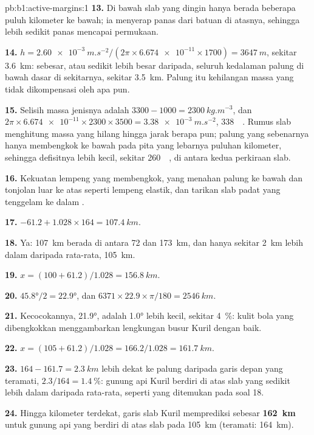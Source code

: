 \begin{solution}{pb:b1:active-margins:1}
\textbf{13.} Di bawah  slab yang dingin hanya berada beberapa puluh kilometer ke
bawah; ia menyerap panas dari batuan di atasnya, sehingga lebih sedikit panas mencapai
permukaan.

\textbf{14.} $h = \qty{2.60e-3}{m.s^{-2}}/(2\pi\times\num{6.674e-11}\times1700)
= \qty{3647}{m}$, sekitar \qty{3.6}{km}: sebesar, atau sedikit lebih besar daripada,
seluruh kedalaman palung di bawah dasar di sekitarnya, sekitar \qty{3.5}{km}. Palung itu
kehilangan massa yang tidak dikompensasi oleh apa pun.

\textbf{15.} Selisih massa jenisnya adalah $3300 - 1000 = \qty{2300}{kg.m^{-3}}$,
dan $2\pi\times\num{6.674e-11}\times2300\times3500 = \qty{3.38e-3}{m.s^{-2}}$,
\qty{338}{\milli\gal}. Rumus slab menghitung massa yang hilang hingga jarak berapa pun;
palung yang sebenarnya hanya membengkok ke bawah pada pita yang lebarnya puluhan
kilometer, sehingga defisitnya lebih kecil, sekitar \qty{260}{\milli\gal}, di antara
kedua perkiraan slab.

\textbf{16.} Kekuatan lempeng yang membengkok, yang menahan palung ke bawah dan
tonjolan luar ke atas seperti lempeng elastik, dan tarikan slab padat yang tenggelam ke
dalam .

\textbf{17.} $-61.2 + 1.028\times164 = \qty{107.4}{km}$.

\textbf{18.} Ya: \qty{107}{km} berada di antara 72 dan \qty{173}{km}, dan hanya sekitar
\qty{2}{km} lebih dalam daripada rata-rata, \qty{105}{km}.

\textbf{19.} $x = (100 + 61.2)/1.028 = \qty{156.8}{km}$.

\textbf{20.} $\ang{45.8}/2 = \ang{22.9}$, dan
$6371\times22.9\times\pi/180 = \qty{2546}{km}$.

\textbf{21.} Kecocokannya, \ang{21.9}, adalah \ang{1.0} lebih kecil, sekitar
\qty{4}{\percent}: kulit bola yang dibengkokkan menggambarkan lengkungan busur Kuril
dengan baik.

\textbf{22.} $x = (105 + 61.2)/1.028 = 166.2/1.028 = \qty{161.7}{km}$.

\textbf{23.} $164 - 161.7 = \qty{2.3}{km}$ lebih dekat ke palung daripada garis depan
yang teramati, $2.3/164 = \qty{1.4}{\percent}$: gunung api Kuril berdiri di atas slab
yang sedikit lebih dalam daripada rata-rata, seperti yang ditemukan pada soal 18.

\textbf{24.} Hingga kilometer terdekat, garis slab Kuril memprediksi 
sebesar \textbf{\qty[text-series-to-math=true]{162}{km}} untuk gunung api yang berdiri di
atas slab pada \qty{105}{km} (teramati: \qty{164}{km}).
\end{solution}
